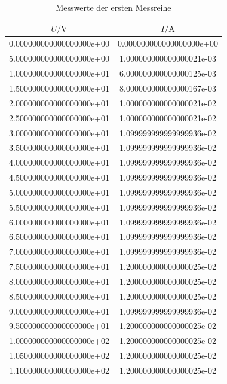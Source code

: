 \begin{table}
  \centering
  \caption{Messwerte der ersten Messreihe}
  \label{tab:Reihe1}
  \begin{tabular}{|S|S|}
    \toprule
    $U/\si{\volt}$ & $I/\si{\ampere}$ \\
    \midrule
    0.000000000000000000e+00 & 0.000000000000000000e+00\\
    5.000000000000000000e+00 & 1.000000000000000021e-03\\
    1.000000000000000000e+01 & 6.000000000000000125e-03\\
    1.500000000000000000e+01 & 8.000000000000000167e-03\\
    2.000000000000000000e+01 & 1.000000000000000021e-02\\
    2.500000000000000000e+01 & 1.000000000000000021e-02\\
    3.000000000000000000e+01 & 1.099999999999999936e-02\\
    3.500000000000000000e+01 & 1.099999999999999936e-02\\
    4.000000000000000000e+01 & 1.099999999999999936e-02\\
    4.500000000000000000e+01 & 1.099999999999999936e-02\\
    5.000000000000000000e+01 & 1.099999999999999936e-02\\
    5.500000000000000000e+01 & 1.099999999999999936e-02\\
    6.000000000000000000e+01 & 1.099999999999999936e-02\\
    6.500000000000000000e+01 & 1.099999999999999936e-02\\
    7.000000000000000000e+01 & 1.099999999999999936e-02\\
    7.500000000000000000e+01 & 1.200000000000000025e-02\\
    8.000000000000000000e+01 & 1.200000000000000025e-02\\
    8.500000000000000000e+01 & 1.200000000000000025e-02\\
    9.000000000000000000e+01 & 1.099999999999999936e-02\\
    9.500000000000000000e+01 & 1.200000000000000025e-02\\
    1.000000000000000000e+02 & 1.200000000000000025e-02\\
    1.050000000000000000e+02 & 1.200000000000000025e-02\\
    1.100000000000000000e+02 & 1.200000000000000025e-02\\

\end{tabular}
\end{table}
